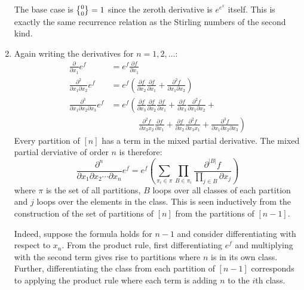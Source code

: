 \begin{solution}
\begin{enumerate}[label=(\alph*)]
        The base case is $\stirlingSnd{0}{0} = 1$ since the zeroth derivative is $e^{e^x}$ itself. This is exactly the same recurrence relation as the Stirling numbers of the second kind.
        \item Again writing the derivatives for $n=1,2,\ldots$:
        \begin{align*}
            \frac{\partial}{\partial x_1}e^f &= e^f\frac{\partial f}{\partial x_1} \\
            \frac{\partial^2}{\partial x_1 \partial x_2}e^f &= e^f\left(\frac{\partial f}{\partial x_2}\frac{\partial f}{\partial x_1} + \frac{\partial^2 f}{\partial x_1 \partial x_2}\right) \\
            \frac{\partial^3}{\partial x_1 \partial x_2 \partial x_3}e^f &= e^f\left(\frac{\partial f}{\partial x_3}\frac{\partial f}{\partial x_2}\frac{\partial f}{\partial x_1} + \frac{\partial f}{\partial x_3}\frac{\partial^2 f}{\partial x_1 \partial x_2} + \right. \\
            & \mspace{60mu} \left.\frac{\partial^2 f}{\partial x_3 x_2}\frac{\partial f}{\partial x_1} + \frac{\partial f}{\partial x_2}\frac{\partial^2 f}{\partial x_3 x_1} + \frac{\partial^3 f}{\partial x_1 \partial x_2 \partial x_3} \right)
        \end{align*}
        Every partition of $[n]$ has a term in the mixed partial derivative. The mixed partial derviative of order $n$ is therefore:
        \[
            \frac{\partial^n}{\partial x_1\partial x_2\cdots\partial x_n}e^f = e^f\left(\sum_{\pi_i\in\pi} \prod_{B \in \pi_i} \frac{\partial^{|B|}f}{\prod_{j\in B} \partial x_j}\right)
        \]
        where $\pi$ is the set of all partitions, $B$ loops over all classes of each partition and $j$ loops over the elements in the class. This is seen inductively from the construction of the set of partitions of $[n]$ from the partitions of $[n-1]$.

        Indeed, suppose the formula holds for $n-1$ and consider differentiating with respect to $x_n$. From the product rule, first differentiating $e^f$ and multiplying with the second term gives rise to partitions where $n$ is in its own class. Further, differentiating the class from each partition of $[n-1]$ corresponds to applying the product rule where each term is adding $n$ to the $i$th class.
    \end{enumerate}
\end{solution}